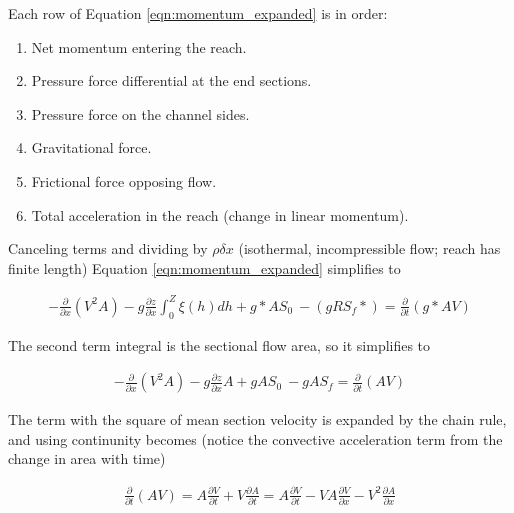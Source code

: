 Each row of  Equation \ref{eqn:momentum_expanded} is in order:
\begin{enumerate}
\item Net momentum entering the reach. 
\item Pressure force differential at the end sections.
\item Pressure force on the channel sides.
\item Gravitational force.
\item Frictional force opposing flow.
\item Total acceleration in the reach (change in linear momentum).
\end{enumerate}

Canceling terms and dividing by $\rho \delta x$ (isothermal, incompressible flow; reach has finite length) Equation \ref{eqn:momentum_expanded} simplifies to 

\begin{equation}
\begin{split}
-\frac{\partial}{\partial x}(V^2A) - g \frac{\partial z}{\partial x}\int_{0}^{Z} \xi(h) dh + g *AS_0~ - ( g R S_f * )  =  \frac{\partial}{\partial t}(g*AV)
\end{split}
\label{eqn:momentum_simpler}
\end{equation}

The second term integral is the sectional flow area, so it simplifies to 

\begin{equation}
\begin{split}
-\frac{\partial}{\partial x}(V^2A) - g \frac{\partial z}{\partial x}A + gAS_0~ -  g A S_f   =  \frac{\partial}{\partial t}(AV)
\end{split}
\label{eqn:momentum_simpler}
\end{equation}

The term with the square of mean section velocity is expanded by the chain rule, and using continunity becomes (notice the convective acceleration term from the change in area with time)

\begin{equation}
\begin{split}
\frac{\partial}{\partial t}( AV) = A \frac{\partial V }{\partial t} + V \frac{\partial A }{\partial t} = A \frac{\partial V }{\partial t} -VA \frac{ \partial V }{\partial x} - V^2 \frac{\partial A }{\partial x} 
\end{split}
\label{eqn:momentum_simpler1}
\end{equation}

